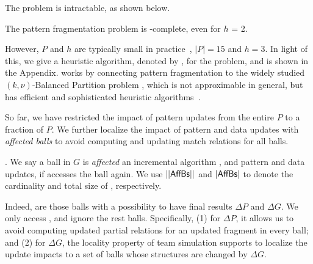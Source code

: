 \eat{%
Given $P$ and a positive integer $h$, the {\em pattern fragmentation}  problem is to find
an $h$-fragmentation of $P$ such that both $\max(|P_{fi}|)$ ($i\in[1,h]$) and $|C|$ are minimized.
%
Intuitively, we want (1)  to avoid skewed updates by making all fragments roughly the same size and (2) to  minimize the efforts to assemble the partial matches of all fragments.
}%

The problem is intractable, as shown below.

\vspace{-0.5ex}
\begin{prop}
	\label{prop-fragmentation}
	The pattern fragmentation problem is \NP-complete, even for $h$ = 2.
\end{prop}

\vspace{-0.5ex}
However, $P$ and $h$ are typically small in practice~\cite{FanLMTWW10}, \eg $|P|=15$ and $h=3$.
In light of this, we give a heuristic algorithm, denoted by , for the problem, and is shown in the Appendix.
 works by connecting pattern fragmentation to the widely studied {\sc $(k, \nu)$-Balanced Partition} problem \cite{AndreevR06},
which is not approximable in general, but has efficient and sophisticated heuristic algorithms~\cite{metis-KarypisK98a}.

\vspace{1.0ex}
So far, we have restricted the impact of pattern updates from the entire $P$ to a fraction of $P$.
We further localize the impact of pattern and data updates  with {\em affected balls} to avoid computing and updating match relations for all balls.

.
We say a ball in $G$ is {\em affected} \wrt an incremental algorithm , and pattern and data updates,
if  accesses the ball again.
We use $||{\mathsf{AffBs}}||$ and $|{\mathsf{AffBs}}|$ to denote the cardinality and total size of \affballsx, respectively.


%
Indeed, \affballsx are those balls with a possibility to have final results \wrt $\Delta P$ and $\Delta G$.
We only access \affballsx, and ignore the rest balls.
Specifically, (1) for $\Delta P$, it allows us to avoid computing updated partial relations for an updated fragment in every ball;
and (2) for $\Delta G$, the locality property of team simulation supports to localize the update impacts to a set of balls whose structures are changed by $\Delta G$.

